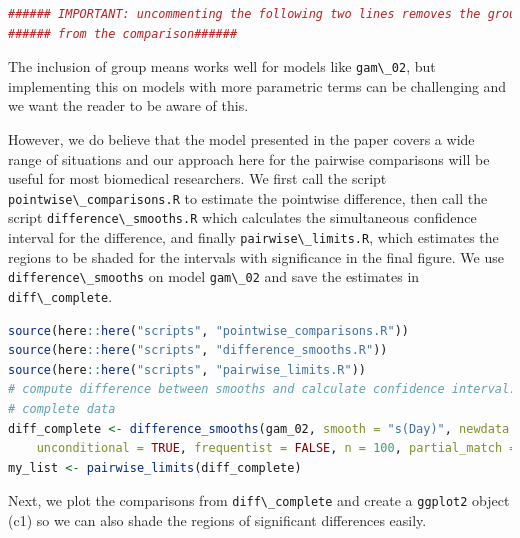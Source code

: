 \documentclass[
]{article}
\newcommand{\passthrough}[1]{#1}
\begin{document}
\begin{lstlisting}[language=R]
###### IMPORTANT: uncommenting the following two lines removes the group means
###### from the comparison######
\end{lstlisting}

The inclusion of group means works well for models like \passthrough{\lstinline!gam\_02!}, but implementing this on models with more parametric terms can be challenging and we want the reader to be aware of this.

However, we do believe that the model presented in the paper covers a wide range of situations and our approach here for the pairwise comparisons will be useful for most biomedical researchers. We first call the script \passthrough{\lstinline!pointwise\_comparisons.R!} to estimate the pointwise difference, then call the script \passthrough{\lstinline!difference\_smooths.R!} which calculates the simultaneous confidence interval for the difference, and finally \passthrough{\lstinline!pairwise\_limits.R!}, which estimates the regions to be shaded for the intervals with significance in the final figure. We use \passthrough{\lstinline!difference\_smooths!} on model \passthrough{\lstinline!gam\_02!} and save the estimates in \passthrough{\lstinline!diff\_complete!}.

\begin{lstlisting}[language=R]
source(here::here("scripts", "pointwise_comparisons.R"))
source(here::here("scripts", "difference_smooths.R"))
source(here::here("scripts", "pairwise_limits.R"))
# compute difference between smooths and calculate confidence interval:
# complete data
diff_complete <- difference_smooths(gam_02, smooth = "s(Day)", newdata = newdat,
    unconditional = TRUE, frequentist = FALSE, n = 100, partial_match = TRUE, nrep = 10000)
my_list <- pairwise_limits(diff_complete)
\end{lstlisting}

Next, we plot the comparisons from \passthrough{\lstinline!diff\_complete!} and create a \passthrough{\lstinline!ggplot2!} object (c1) so we can also shade the regions of significant differences easily.
\end{document}
